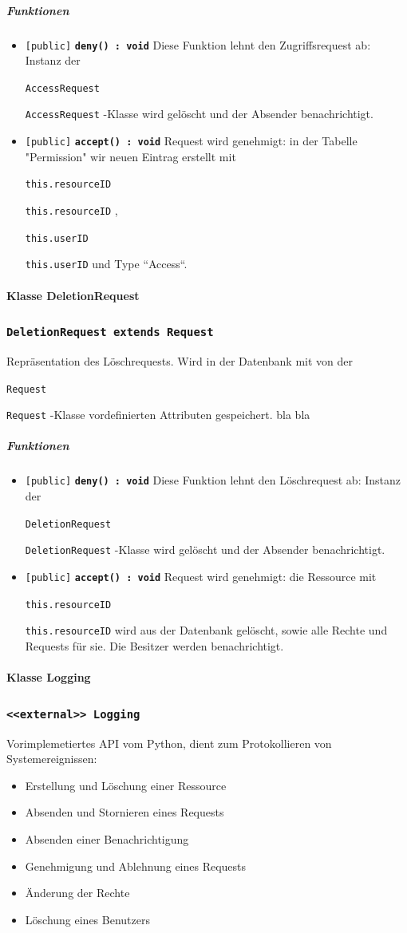 \documentclass[parskip=full,11pt]{scrartcl}
\makeatletter
\newcommand{\lstInline}[2][,]{%
	\begingroup%
	\lstset{#1}%
	\begin{lrbox}{\mylisting}\lstinline!#2!\end{lrbox}%
	\setlength{\@tempdima}{\linegoal}%
	\ifdim\wd\mylisting>\@tempdima\hfill\\\fi%
	\lstinline!#2!%
	\endgroup%
}
\newcommand{\class}[1]{\subsubsection*{\lstinline[basicstyle=\ttfamily\large]{#1}}}
\newcommand{\mtd}[5]{\lstinline{[#4]} \textbf{\lstinline{#1(#3) : #2}} \newline #5}
\newcommand{\inlinecode}[1]{\lstInline[breaklines=true]{#1}}
\makeatother
\begin{document}
\subparagraph*{Funktionen}  %
\begin{itemize}
	\item \mtd{deny}{void}{}{public}{
	Diese Funktion lehnt den Zugriffsrequest ab: Instanz der \inlinecode{AccessRequest}-Klasse wird gelöscht und der Absender benachrichtigt.
	}
	
	\item \mtd{accept}{void}{}{public}{
	Request wird genehmigt: in der Tabelle "Permission" wir neuen Eintrag erstellt mit \inlinecode{this.resourceID}, \inlinecode{this.userID} und Type ``Access``.
	}
\end{itemize}

  \paragraph*{Klasse DeletionRequest}
  
 \class{DeletionRequest extends Request}
Repräsentation des Löschrequests. Wird in der Datenbank mit von der \inlinecode{Request}-Klasse vordefinierten Attributen gespeichert.
 bla bla
 
\subparagraph*{Funktionen}  %
\begin{itemize}
	\item \mtd{deny}{void}{}{public}{
	Diese Funktion lehnt den Löschrequest ab: Instanz der \inlinecode{DeletionRequest}-Klasse wird gelöscht und der Absender benachrichtigt.
	}
	
	\item \mtd{accept}{void}{}{public}{
	Request wird genehmigt: die Ressource mit \inlinecode{this.resourceID} wird aus der Datenbank gelöscht, sowie alle Rechte und Requests für sie. Die Besitzer werden benachrichtigt.
	}
\end{itemize}
\newpage
  \paragraph*{Klasse Logging}
 \class{<<external>> Logging}
Vorimplemetiertes API vom Python, dient zum Protokollieren von Systemereignissen:
\begin{itemize}
	\item Erstellung und Löschung einer Ressource
	\item Absenden und Stornieren eines Requests
	\item Absenden einer Benachrichtigung
	\item Genehmigung und Ablehnung eines Requests
	\item Änderung der Rechte
	\item Löschung eines Benutzers 
\end{itemize}
 
\end{document}
